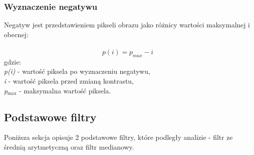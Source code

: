 \documentclass{classrep}
\begin{document}
\subsubsection{Wyznaczenie negatywu}
Negatyw jest przedstawieniem pikseli obrazu jako różnicy wartości maksymalnej i obecnej:\\
\\
\[p(i) = p_{max} - i\]
gdzie:\\
\textit{p(i)} - wartość piksela po wyznaczeniu negatywu,\\
\textit{i} - wartość piksela przed zmianą kontrastu,\\
\textit{p$_{\text{max}}$} - maksymalna wartość piksela.\\

\subsection{Podstawowe filtry}
Poniższa sekcja opisuje 2 podstawowe filtry, które podległy analizie - filtr ze średnią arytmetyczną oraz filtr medianowy.
\end{document}
